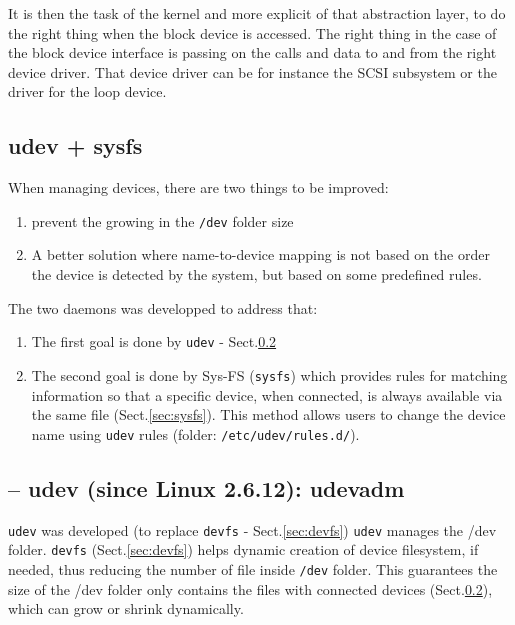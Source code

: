 It is then the task of the kernel and more explicit of that abstraction layer,
to do the right thing when the block device is accessed. The right thing in the
case of the block device interface is passing on the calls and data to and from
the right device driver. That device driver can be for instance the SCSI
subsystem or the driver for the loop device.




\subsection{udev + sysfs}
\label{sec:udev_sysfs}

When managing devices, there are two things to be improved: 
\begin{enumerate}
  \item prevent the growing in the \verb!/dev!
folder size

  \item A better solution where name-to-device mapping is not based on
the order the device is detected by the system, but based on some predefined
rules.
\end{enumerate}

The two daemons was developped to address that:
\begin{enumerate}
  
  \item  The first goal is done by \verb!udev! - Sect.\ref{sec:udev}
  
  \item The second goal is done by Sys-FS (\verb!sysfs!) which provides rules
  for matching information so that a specific device, when connected, is always
  available via the same file (Sect.\ref{sec:sysfs}). This method allows users
  to change the device name using \verb!udev! rules (folder:
  \verb!/etc/udev/rules.d/!). 
  
\end{enumerate}


\subsection{-- udev (since Linux 2.6.12): udevadm}
\label{sec:udev}

\verb!udev! was developed (to replace \verb!devfs! - Sect.\ref{sec:devfs})
\verb!udev! manages the /dev folder. 
\verb!devfs! (Sect.\ref{sec:devfs}) helps dynamic creation of device filesystem,
if needed, thus reducing the number of file inside \verb!/dev! folder. 
This guarantees the size of the /dev folder only contains the files with
connected devices (Sect.\ref{sec:udev}), which can grow or shrink dynamically.

